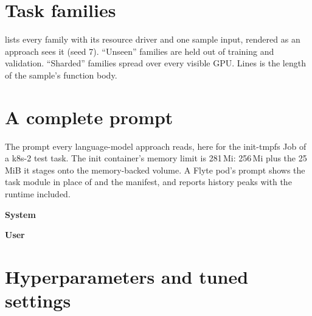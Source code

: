 \section{Task families}
\label{app:families}

 lists every family with its resource driver and one sample input,
rendered as an approach sees it (seed 7). ``Unseen'' families are held out of training
and validation. ``Sharded'' families spread over every visible GPU. Lines is the
length of the sample's function body.

\begin{table}[h]
\centering\small
\caption{The 33 task families.}
\label{tab:families}
\resizebox{\linewidth}{!}{}
\end{table}

\section{A complete prompt}
\label{app:prompt}

The prompt every language-model approach reads, here for the init-tmpfs Job of a
k8s-2 test task. The init container's memory limit is 281\,Mi: 256\,Mi plus the
25\,MiB it stages onto the memory-backed volume. A Flyte pod's prompt shows the task
module in place of  and the manifest, and reports history peaks with the
runtime included.

\noindent\textbf{\small System}

\noindent\textbf{\small User}


\section{Hyperparameters and tuned settings}
\label{app:hyper}

